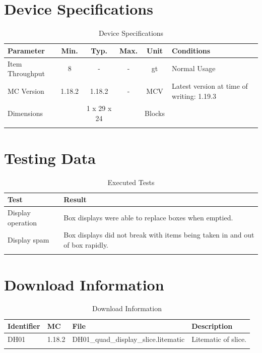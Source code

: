 \documentclass[10pt]{datasheet}
\begin{document}
\onecolumn

\section{Device Specifications}

\begin{table}[h]
    \caption{Device Specifications}
    \begin{tabularx}{\textwidth}{l | c c c | c | X}
        \thickhline
        \textbf{Parameter} & \textbf{Min.} & \textbf{Typ.} & \textbf{Max.} &
        \textbf{Unit} & \textbf{Conditions} \\
        \hline
        Item Throughput  & 8 & - & - & gt & Normal Usage \\
        \hline
        MC Version & 1.18.2 & 1.18.2 & - & MCV & Latest version at time of writing: 1.19.3\\
        \hline
        Dimensions & & 1 x 29 x 24 & & Blocks & \\
        \thickhline
\end{tabularx}
\end{table}
\newpage
\section{Testing Data}
\begin{table}[h]
\caption{Executed Tests}
\begin{tabularx}{\textwidth}{l | X}
    \thickhline
    \textbf{Test} & \textbf{Result} \\
    \hline
    Display operation & Box displays were able to replace boxes when emptied. \\
    \hline
    Display spam & Box displays did not break with items being taken in and out of box rapidly. \\
    \thickhline
\end{tabularx}
\end{table}

\section{Download Information}
\begin{table}[h]
    \caption{Download Information}
    \begin{tabularx}{\textwidth}{l | l | l | X}
        \thickhline
        \textbf{Identifier} & \textbf{MC} & \textbf{File} & \textbf{Description} \\
        \hline
        DH01 & 1.18.2 & DH01\_quad\_display\_slice.litematic & Litematic of slice. \\
        \hline
        \thickhline
    \end{tabularx}
\end{table}
\end{document}
